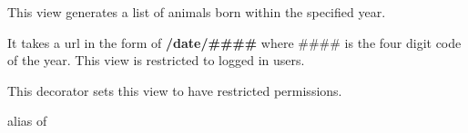 \documentclass[letterpaper,10pt,english]{sphinxmanual}
\begin{document}

\begin{fulllineitems}
\label{animals:mousedb.animal.views.AnimalMonthArchive}
This view generates a list of animals born within the specified year.

It takes a url in the form of \textbf{/date/\#\#\#\#} where \#\#\#\# is the four digit code of the year.
This view is restricted to logged in users.

\begin{fulllineitems}
\label{animals:mousedb.animal.views.AnimalMonthArchive.dispatch}
This decorator sets this view to have restricted permissions.

\end{fulllineitems}


\begin{fulllineitems}
\label{animals:mousedb.animal.views.AnimalMonthArchive.model}
alias of 

\end{fulllineitems}


\end{fulllineitems}

\end{document}
